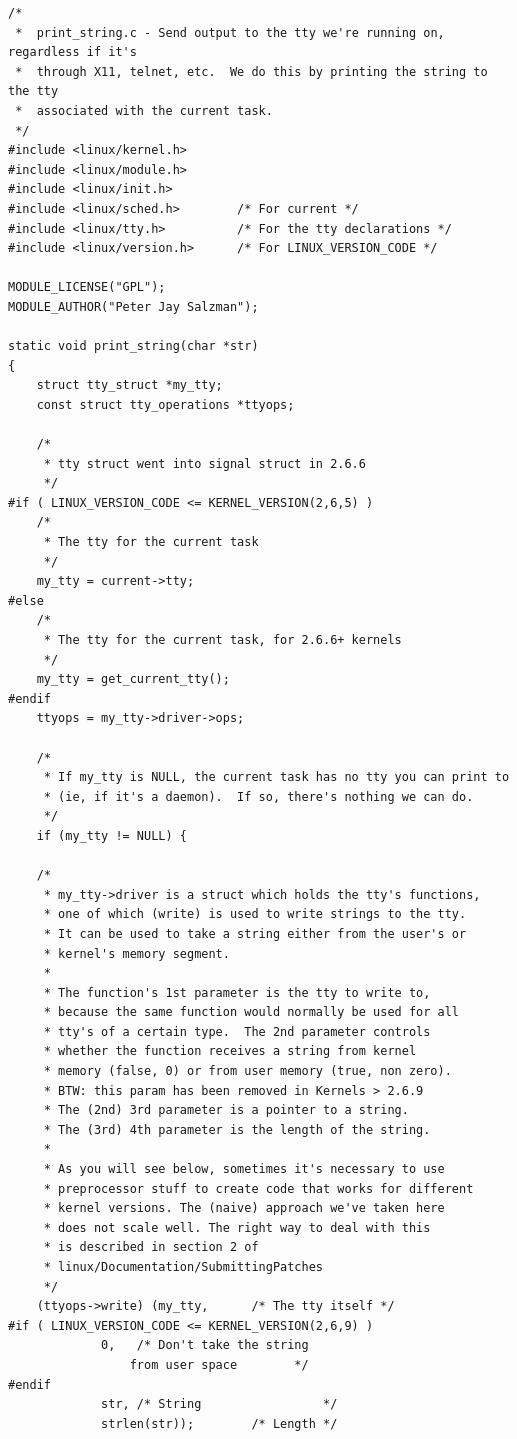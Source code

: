 \documentclass[11pt]{article}
\begin{document}
\begin{verbatim}
/*
 *  print_string.c - Send output to the tty we're running on, regardless if it's
 *  through X11, telnet, etc.  We do this by printing the string to the tty
 *  associated with the current task.
 */
#include <linux/kernel.h>
#include <linux/module.h>
#include <linux/init.h>
#include <linux/sched.h>        /* For current */
#include <linux/tty.h>          /* For the tty declarations */
#include <linux/version.h>      /* For LINUX_VERSION_CODE */

MODULE_LICENSE("GPL");
MODULE_AUTHOR("Peter Jay Salzman");

static void print_string(char *str)
{
    struct tty_struct *my_tty;
    const struct tty_operations *ttyops;

    /*
     * tty struct went into signal struct in 2.6.6
     */
#if ( LINUX_VERSION_CODE <= KERNEL_VERSION(2,6,5) )
    /*
     * The tty for the current task
     */
    my_tty = current->tty;
#else
    /*
     * The tty for the current task, for 2.6.6+ kernels
     */
    my_tty = get_current_tty();
#endif
    ttyops = my_tty->driver->ops;

    /*
     * If my_tty is NULL, the current task has no tty you can print to
     * (ie, if it's a daemon).  If so, there's nothing we can do.
     */
    if (my_tty != NULL) {

	/*
	 * my_tty->driver is a struct which holds the tty's functions,
	 * one of which (write) is used to write strings to the tty.
	 * It can be used to take a string either from the user's or
	 * kernel's memory segment.
	 *
	 * The function's 1st parameter is the tty to write to,
	 * because the same function would normally be used for all
	 * tty's of a certain type.  The 2nd parameter controls
	 * whether the function receives a string from kernel
	 * memory (false, 0) or from user memory (true, non zero).
	 * BTW: this param has been removed in Kernels > 2.6.9
	 * The (2nd) 3rd parameter is a pointer to a string.
	 * The (3rd) 4th parameter is the length of the string.
	 *
	 * As you will see below, sometimes it's necessary to use
	 * preprocessor stuff to create code that works for different
	 * kernel versions. The (naive) approach we've taken here
	 * does not scale well. The right way to deal with this
	 * is described in section 2 of
	 * linux/Documentation/SubmittingPatches
	 */
	(ttyops->write) (my_tty,      /* The tty itself */
#if ( LINUX_VERSION_CODE <= KERNEL_VERSION(2,6,9) )
			 0,   /* Don't take the string
				 from user space        */
#endif
			 str, /* String                 */
			 strlen(str));        /* Length */


\end{verbatim}
\end{document}
